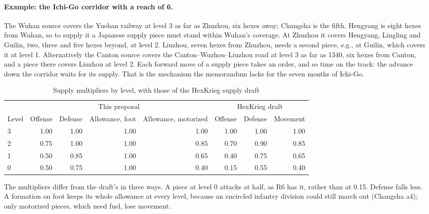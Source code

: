 \documentclass[11pt]{article}
\begin{document}
\paragraph{Example: the Ichi-Go corridor with a reach of 6.} The Wuhan source covers the Yuehan railway at level 3 as far as Zhuzhou, six hexes away; Changsha is the fifth. Hengyang is eight hexes from Wuhan, so to supply it a Japanese supply piece must stand within Wuhan's coverage. At Zhuzhou it covers Hengyang, Lingling and Guilin, two, three and five hexes beyond, at level 2. Liuzhou, seven hexes from Zhuzhou, needs a second piece, e.g., at Guilin, which covers it at level 1. Alternatively the Canton source covers the Canton--Wuzhou--Liuzhou road at level 3 as far as 1340, six hexes from Canton, and a piece there covers Liuzhou at level 2. Each forward move of a supply piece takes an order, and so time on the track: the advance down the corridor waits for its supply. That is the mechanism the memorandum lacks for the seven months of Ichi-Go.

\begin{table}[ht]
\centering\small
\begin{tabular}{@{}lrrrr@{\qquad}rrr@{}}
\toprule
& \multicolumn{4}{c}{This proposal} & \multicolumn{3}{c}{HexKrieg draft} \\
Level & Offense & Defense & Allowance, foot & Allowance, motorized & Offense & Defense & Movement \\
\midrule
3 & 1.00 & 1.00 & 1.00 & 1.00 & 1.00 & 1.00 & 1.00 \\
2 & 0.75 & 1.00 & 1.00 & 0.85 & 0.70 & 0.90 & 0.85 \\
1 & 0.50 & 0.85 & 1.00 & 0.65 & 0.40 & 0.75 & 0.65 \\
0 & 0.50 & 0.75 & 1.00 & 0.40 & 0.15 & 0.55 & 0.40 \\
\bottomrule
\end{tabular}
\caption{Supply multipliers by level, with those of the HexKrieg supply draft}\label{tab:supply}
\end{table}

The multipliers differ from the draft's in three ways. A piece at level 0 attacks at half, as R6 has it, rather than at 0.15. Defense falls less. A formation on foot keeps its whole allowance at every level, because an encircled infantry division could still march out (Changsha a4); only motorized pieces, which need fuel, lose movement.
\end{document}

